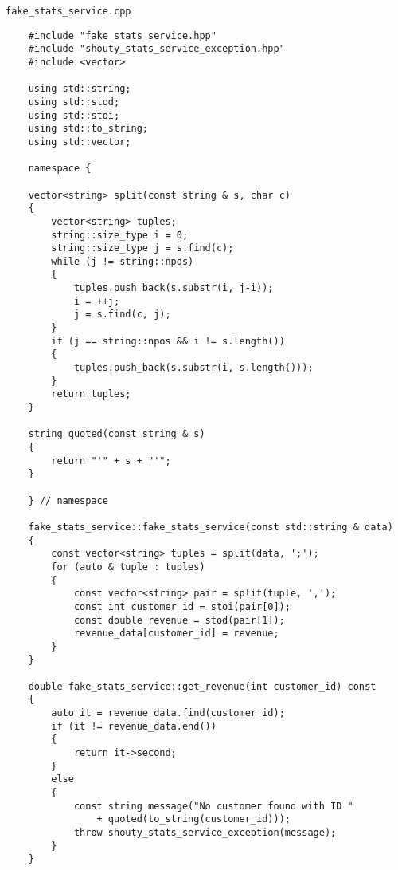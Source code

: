 \texttt{fake_stats_service.cpp}

\begin{verbatim}
    #include "fake_stats_service.hpp"
    #include "shouty_stats_service_exception.hpp"
    #include <vector>
    
    using std::string;
    using std::stod;
    using std::stoi;
    using std::to_string;
    using std::vector;
    
    namespace {
        
    vector<string> split(const string & s, char c)
    {
        vector<string> tuples;
        string::size_type i = 0;
        string::size_type j = s.find(c);
        while (j != string::npos)
        {
            tuples.push_back(s.substr(i, j-i));
            i = ++j;
            j = s.find(c, j);
        }
        if (j == string::npos && i != s.length())
        {
            tuples.push_back(s.substr(i, s.length()));
        }
        return tuples;
    }
    
    string quoted(const string & s)
    {
        return "'" + s + "'";
    }
        
    } // namespace
    
    fake_stats_service::fake_stats_service(const std::string & data)
    {
        const vector<string> tuples = split(data, ';');
        for (auto & tuple : tuples)
        {
            const vector<string> pair = split(tuple, ',');
            const int customer_id = stoi(pair[0]);
            const double revenue = stod(pair[1]);
            revenue_data[customer_id] = revenue;
        }
    }
    
    double fake_stats_service::get_revenue(int customer_id) const
    {
        auto it = revenue_data.find(customer_id);
        if (it != revenue_data.end())
        {
        	return it->second;
        }
        else
        {
            const string message("No customer found with ID "
        		+ quoted(to_string(customer_id)));
        	throw shouty_stats_service_exception(message);
        }
    }
\end{verbatim}
